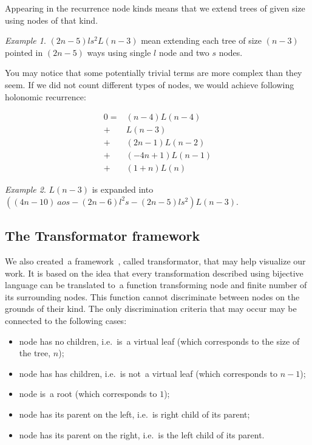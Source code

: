 \documentclass[final]{article}
\theoremstyle{definition}
\theoremstyle{definition}
\theoremstyle{remark}
\newtheorem{example}{Example}[subsection]
\begin{document}
Appearing in the recurrence node kinds means that we extend trees of given size using nodes of that kind.

\begin{example}
    \((2n - 5) l s^2 L(n - 3)\) mean extending each tree of size \((n - 3)\) pointed in \((2n - 5)\) ways using single \(l\) node and two \(s\) nodes.
\end{example}

You may notice that some potentially trivial terms are more complex than they seem. If we did not count different types of nodes, we would achieve following holonomic recurrence:

\[\begin{array}{rl}
        0 =& (n - 4) L(n - 4)\\
        +& L(n - 3)\\
        +& (2 n - 1) L(n - 2)\\
        +& (-4 n + 1) L(n - 1)\\
        +& (1 + n) L(n)
\end{array}\]

\begin{example}
    \(L(n-3)\) is expanded into \(((4 n - 10)~a o s - (2 n - 6) l^2 s - (2 n - 5) l s^2) L(n - 3)\).
\end{example}


\subsection{The Transformator framework}%
\label{sub:the_framework}

We also created~a framework~\cite{transformator}, called transformator, that may help visualize our work. It is based on the idea that every transformation described using bijective language can be translated to~a function transforming node and finite number of its surrounding nodes. This function cannot discriminate between nodes on the grounds of their kind. The only discrimination criteria that may occur may be connected to the following cases:
\begin{itemize}
    \item node has no children, i.e.~is~a virtual leaf (which corresponds to the size of the tree, \(n\));
    \item node has has children, i.e.~is not~a virtual leaf (which corresponds to \(n - 1\));
    \item node is~a root (which corresponds to \(1\));
    \item node has its parent on the left, i.e.~is right child of its parent;
    \item node has its parent on the right, i.e.~is the left child of its parent.
\end{itemize}
\end{document}
